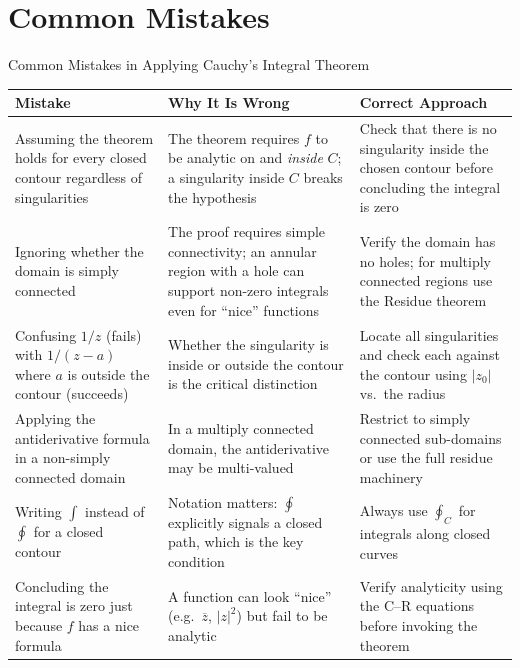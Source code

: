 \documentclass[12pt,a4paper]{article}
\begin{document}
\section{Common Mistakes}

\begin{mistakebox}{Common Mistakes in Applying Cauchy's Integral Theorem}
\begin{center}
\begin{tabular}{p{4.5cm} p{4.5cm} p{4.5cm}}
\toprule
\textbf{Mistake} & \textbf{Why It Is Wrong} & \textbf{Correct Approach} \\
\midrule
Assuming the theorem holds for every closed contour regardless of singularities
&
The theorem requires $f$ to be analytic on and \emph{inside} $C$;
a singularity inside $C$ breaks the hypothesis
&
Check that there is no singularity inside the chosen contour before concluding the integral is zero \\
\addlinespace
Ignoring whether the domain is simply connected
&
The proof requires simple connectivity;
an annular region with a hole can support non-zero integrals even for ``nice'' functions
&
Verify the domain has no holes; for multiply connected regions use the Residue theorem \\
\addlinespace
Confusing $1/z$ (fails) with $1/(z-a)$ where $a$ is outside the contour (succeeds)
&
Whether the singularity is inside or outside the contour is the critical distinction
&
Locate all singularities and check each against the contour using $|z_0|$ vs.\ the radius \\
\addlinespace
Applying the antiderivative formula in a non-simply connected domain
&
In a multiply connected domain, the antiderivative may be multi-valued
&
Restrict to simply connected sub-domains or use the full residue machinery \\
\addlinespace
Writing $\int$ instead of $\oint$ for a closed contour
&
Notation matters: $\oint$ explicitly signals a closed path, which is the key condition
&
Always use $\oint_{C}$ for integrals along closed curves \\
\addlinespace
Concluding the integral is zero just because $f$ has a nice formula
&
A function can look ``nice'' (e.g.\ $\overline{z}$, $|z|^2$) but fail to be analytic
&
Verify analyticity using the C--R equations before invoking the theorem \\
\bottomrule
\end{tabular}
\end{center}
\end{mistakebox}
\end{document}
